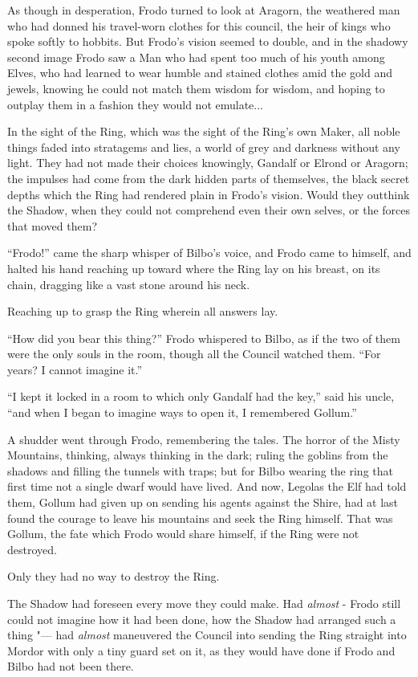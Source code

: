 As though in desperation, Frodo turned to look at Aragorn, the weathered
man who had donned his travel-worn clothes for this council, the heir of
kings who spoke softly to hobbits. But Frodo's vision seemed to double,
and in the shadowy second image Frodo saw a Man who had spent too much
of his youth among Elves, who had learned to wear humble and stained
clothes amid the gold and jewels, knowing he could not match them wisdom
for wisdom, and hoping to outplay them in a fashion they would not
emulate...

In the sight of the Ring, which was the sight of the Ring's own Maker,
all noble things faded into stratagems and lies, a world of grey and
darkness without any light. They had not made their choices knowingly,
Gandalf or Elrond or Aragorn; the impulses had come from the dark hidden
parts of themselves, the black secret depths which the Ring had rendered
plain in Frodo's vision. Would they outthink the Shadow, when they could
not comprehend even their own selves, or the forces that moved them?

``Frodo!'' came the sharp whisper of Bilbo's voice, and Frodo came to
himself, and halted his hand reaching up toward where the Ring lay on
his breast, on its chain, dragging like a vast stone around his neck.

Reaching up to grasp the Ring wherein all answers lay.

``How did you bear this thing?'' Frodo whispered to Bilbo, as if the two
of them were the only souls in the room, though all the Council watched
them. ``For years? I cannot imagine it.''

``I kept it locked in a room to which only Gandalf had the key,'' said
his uncle, ``and when I began to imagine ways to open it, I remembered
Gollum.''

A shudder went through Frodo, remembering the tales. The horror of the
Misty Mountains, thinking, always thinking in the dark; ruling the
goblins from the shadows and filling the tunnels with traps; but for
Bilbo wearing the ring that first time not a single dwarf would have
lived. And now, Legolas the Elf had told them, Gollum had given up on
sending his agents against the Shire, had at last found the courage to
leave his mountains and seek the Ring himself. That was Gollum, the fate
which Frodo would share himself, if the Ring were not destroyed.

Only they had no way to destroy the Ring.

The Shadow had foreseen every move they could make. Had \emph{almost} -
Frodo still could not imagine how it had been done, how the Shadow had
arranged such a thing "--- had \emph{almost} maneuvered the Council into
sending the Ring straight into Mordor with only a tiny guard set on it,
as they would have done if Frodo and Bilbo had not been there.

